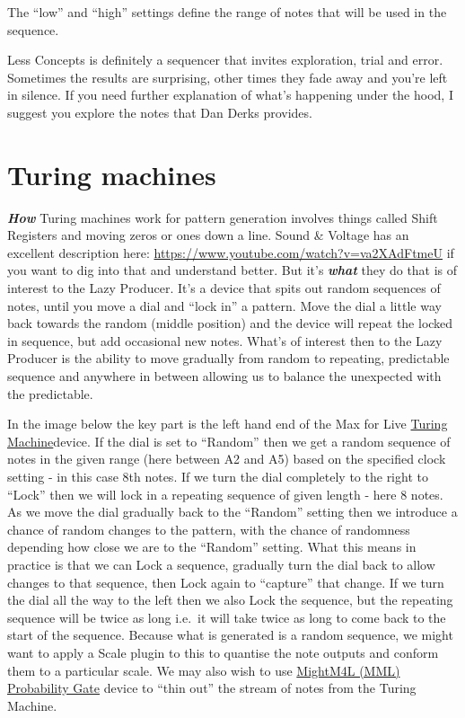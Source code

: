 \documentclass[
  12pt,
  letterpaper,
  oneside,
  open=any]{scrbook}
\makeatletter
\newcommand*\pandocbounded[1]{%
  \sbox\pandoc@box{#1}%
  \Gscale@div\@tempa{\textheight}{\dimexpr\ht\pandoc@box+\dp\pandoc@box\relax}%
  \Gscale@div\@tempb{\linewidth}{\wd\pandoc@box}%
  \ifdim\@tempb\p@<\@tempa\p@\let\@tempa\@tempb\fi%
  \ifdim\@tempa\p@<\p@\scalebox{\@tempa}{\usebox\pandoc@box}%
  \else\usebox{\pandoc@box}%
  \fi%
}
\makeatother
\begin{document}
The ``low'' and ``high'' settings define the range of notes that will be
used in the sequence.

Less Concepts is definitely a sequencer that invites exploration, trial
and error. Sometimes the results are surprising, other times they fade
away and you're left in silence. If you need further explanation of
what's happening under the hood, I suggest you explore the notes that
Dan Derks provides.

\pandocbounded{\texttt{[image: images/Less\_concepts.png]}}

\section{Turing machines}\label{turing-machines}

\textbf{\emph{How}} Turing machines work for pattern generation involves
things called Shift Registers and moving zeros or ones down a line.
Sound \& Voltage has an excellent description here:
\url{https://www.youtube.com/watch?v=va2XAdFtmeU} if you want to dig
into that and understand better. But it's \textbf{\emph{what}} they do
that is of interest to the Lazy Producer. It's a device that spits out
random sequences of notes, until you move a dial and ``lock in'' a
pattern. Move the dial a little way back towards the random (middle
position) and the device will repeat the locked in sequence, but add
occasional new notes. What's of interest then to the Lazy Producer is
the ability to move gradually from random to repeating, predictable
sequence and anywhere in between allowing us to balance the unexpected
with the predictable.

In the image below the key part is the left hand end of the Max for Live
\href{https://maxforlive.com/library/device/5988/turing-machine}{Turing
Machine}device. If the dial is set to ``Random'' then we get a random
sequence of notes in the given range (here between A2 and A5) based on
the specified clock setting - in this case 8th notes. If we turn the
dial completely to the right to ``Lock'' then we will lock in a
repeating sequence of given length - here 8 notes. As we move the dial
gradually back to the ``Random'' setting then we introduce a chance of
random changes to the pattern, with the chance of randomness depending
how close we are to the ``Random'' setting. What this means in practice
is that we can Lock a sequence, gradually turn the dial back to allow
changes to that sequence, then Lock again to ``capture'' that change. If
we turn the dial all the way to the left then we also Lock the sequence,
but the repeating sequence will be twice as long i.e.~it will take twice
as long to come back to the start of the sequence. Because what is
generated is a random sequence, we might want to apply a Scale plugin to
this to quantise the note outputs and conform them to a particular
scale. We may also wish to use
\href{https://maxforlive.com/library/device/6982/mm4l-probability-gate}{MightM4L
(MML) Probability Gate} device to ``thin out'' the stream of notes from
the Turing Machine.
\end{document}
